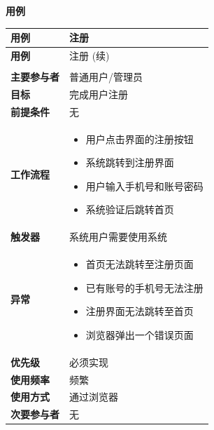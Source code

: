 \documentclass[12pt,a4paper,UTF8]{article}
\begin{document}
\noindent\textbf{用例}

\begin{xltabular}{\linewidth}{|>{\raggedright\arraybackslash}p{3cm}|>{\raggedright\arraybackslash}p{8cm}|}
  \hline
  \textbf{用例} & 注册 \\ \hline 
  \endfirsthead
  
  \hline
  \textbf{用例} & 注册 (续) \\ \hline 
  \endhead
  
  \hline
   \\ 
  \endfoot
  
  \hline 
  \endlastfoot
  
  \textbf{主要参与者} & 普通用户/管理员 \\ \hline
  \textbf{目标} & 完成用户注册 \\ \hline
  \textbf{前提条件} & 无 \\ \hline
  \textbf{工作流程} & 
  \vspace{-0.5em}
  \begin{itemize}[topsep=0pt, partopsep=0pt, left=0pt, nosep]
    \item 用户点击界面的注册按钮
    \item 系统跳转到注册界面
    \item 用户输入手机号和账号密码
    \item 系统验证后跳转首页
  \end{itemize} \\ \hline
  \textbf{触发器} & 系统用户需要使用系统 \\ \hline
  \textbf{异常} & 
  \vspace{-0.5em}
  \begin{itemize}[topsep=0pt, partopsep=0pt, left=0pt, nosep]
    \item 首页无法跳转至注册页面
    \item 已有账号的手机号无法注册
    \item 注册界面无法跳转至首页
    \item 浏览器弹出一个错误页面
  \end{itemize} \\ \hline
  \textbf{优先级} & 必须实现 \\ \hline
  \textbf{使用频率} & 频繁 \\ \hline
  \textbf{使用方式} & 通过浏览器 \\ \hline
  \textbf{次要参与者} & 无 \\ \hline
\end{xltabular}
\end{document}
